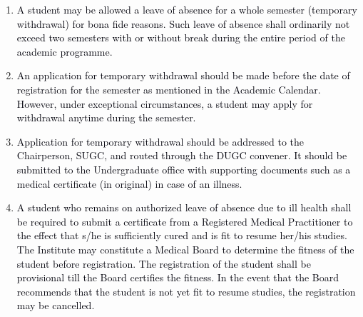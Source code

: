 \documentclass[12pt]{article}
\begin{document}
\vspace{\baselineskip}
\begin{enumerate}
	\item {\fontsize{10pt}{12.0pt}\selectfont \textcolor[HTML]{00000A}{A student may be allowed a leave of absence for a whole semester (temporary withdrawal) for bona fide reasons. Such leave of absence shall ordinarily not exceed two semesters with or without break during the entire period of the academic programme.}\par}\par


\vspace{\baselineskip}
	\item {\fontsize{10pt}{12.0pt}\selectfont \textcolor[HTML]{00000A}{An application for temporary withdrawal should be made before the date of registration for the semester as mentioned in the Academic Calendar. However, under exceptional circumstances, a student may apply for withdrawal anytime during the semester.}\par}\par


\vspace{\baselineskip}
	\item {\fontsize{10pt}{12.0pt}\selectfont \textcolor[HTML]{00000A}{Application for temporary withdrawal should be addressed to the Chairperson, SUGC, and routed through the DUGC convener. It should be submitted to the Undergraduate office with supporting documents such as a medical certificate (in original) in case of an illness.}\par}\par


\vspace{\baselineskip}
	\item {\fontsize{10pt}{12.0pt}\selectfont \textcolor[HTML]{00000A}{A student who remains on authorized leave of absence due to ill health shall be required to submit a certificate from a Registered Medical Practitioner to the effect that s/he is sufficiently cured and is fit to resume her/his studies. The Institute may constitute a Medical Board to determine the fitness of the student before registration. The registration of the student shall be provisional till the Board certifies the fitness. In the event that the Board recommends that the student is not yet fit to resume studies, the registration may be cancelled.}\par}
\end{enumerate}\par
\end{document}

